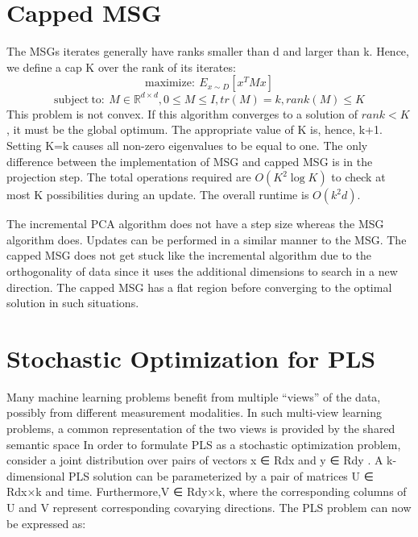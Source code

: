 \documentclass{article}
\begin{document}
\section{Capped MSG}
The MSGs iterates generally have ranks smaller than d and larger than k. Hence, we define a cap K over the rank of its iterates:
\begin{equation}\label{eq:6} 
\mathrm{maximize :\ }E_{x\sim D}\left[ x^{T}Mx\right]
\end{equation}
\begin{equation}
\mathrm{subject\ to :\ }M\in \mathbb{R} ^{d\times d},0\leq M\leq I,tr\left( M\right) =k,rank\left( M\right) \leq K
\end{equation}
This problem is not convex. If this algorithm converges to a solution of $rank < K$, it must be the global optimum. The appropriate value of K is, hence, k+1. Setting K=k causes all non-zero eigenvalues to be equal to one. The only difference between the implementation of MSG and capped MSG is in the projection step. The total operations required are $O\left( K^{2}\log K\right) $ to check at most K possibilities during an update. The overall runtime is $O\left(k^{2}d\right) $.

The incremental PCA algorithm does not have a step size whereas the MSG algorithm does. Updates can be performed in a similar manner to the MSG. The capped MSG does not get stuck like the incremental algorithm due to the orthogonality of data since it uses the additional dimensions to search in a new direction. The capped MSG has a flat region before converging to the optimal solution in such situations.

\section{Stochastic Optimization for PLS}
Many machine learning problems benefit from multiple “views” of the data, possibly from different measurement modalities. In such multi-view learning problems, a common representation of the two views is provided by the shared semantic space
In order to formulate PLS as a stochastic optimization problem, consider a joint distribution over pairs of vectors x ∈ Rdx and y ∈ Rdy . A k-dimensional PLS solution can be parameterized by a pair of matrices U ∈ Rdx×k and time. Furthermore,V ∈ Rdy×k, where the corresponding columns of U and V represent corresponding covarying directions. The PLS problem can now be expressed as:
\end{document}
